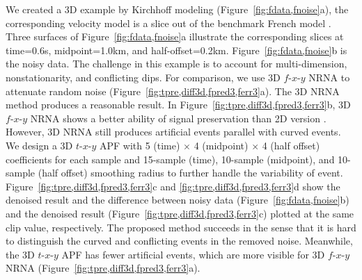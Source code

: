 We created a 3D example by Kirchhoff modeling
(Figure~\ref{fig:fdata,fnoise}a), the corresponding velocity model is
a slice out of the benchmark French model
\cite[]{French74,Liu10c}. Three surfaces of
Figure~\ref{fig:fdata,fnoise}a illustrate the corresponding slices at
time=0.6s, midpoint=1.0km, and
half-offset=0.2km. Figure~\ref{fig:fdata,fnoise}b is the noisy
data. The challenge in this example is to account for multi-dimension,
nonstationarity, and conflicting dips. For comparison, we use 3D
$f$-$x$-$y$ NRNA \cite[]{Liu13} to attenuate random noise
({Figure~\ref{fig:tpre,diff3d,fpred3,ferr3}a}). The 3D NRNA method
produces a reasonable result. In
Figure~\ref{fig:tpre,diff3d,fpred3,ferr3}b, 3D $f$-$x$-$y$ NRNA shows
a better ability of signal preservation than 2D version
\cite[]{Liu12}. However, 3D NRNA still produces artificial events parallel
with curved events. We design a 3D $t$-$x$-$y$ APF with 5 (time)
$\times$ 4 (midpoint) $\times$ 4 (half offset) coefficients for each
sample and 15-sample (time), 10-sample (midpoint), and 10-sample (half
offset) smoothing radius to further handle the variability of
event. Figure~\ref{fig:tpre,diff3d,fpred3,ferr3}c and
\ref{fig:tpre,diff3d,fpred3,ferr3}d show the denoised result and the
difference between noisy data (Figure~\ref{fig:fdata,fnoise}b) and the
denoised result (Figure~\ref{fig:tpre,diff3d,fpred3,ferr3}c) plotted
at the same clip value, respectively. The proposed method succeeds in
the sense that it is hard to distinguish the curved and conflicting
events in the removed noise. Meanwhile, the 3D $t$-$x$-$y$ APF has
fewer artificial events, which are more visible for 3D $f$-$x$-$y$
NRNA (Figure~\ref{fig:tpre,diff3d,fpred3,ferr3}a).



